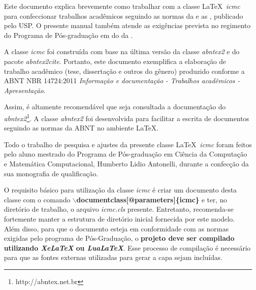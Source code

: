 \newcommand{\comando}[1]{\textbf{$\backslash$#1}}

Este documento explica brevemente como trabalhar com a classe \LaTeX~\textit{icmc} para confeccionar trabalhos acadêmicos seguindo as normas da  e as , publicado pelo  USP. O presente manual também atende as exigências prevista no regimento do Programa de Pós-graduação em  do  da .


A classe \textit{icmc} foi construída com base na última versão da classe \textit{abntex2} e do pacote \textit{abntex2cite}. Portanto, este documento exemplifica a elaboração de trabalho
acadêmico (tese, dissertação e outros do gênero) produzido conforme a ABNT NBR
14724:2011 \textit{Informação e documentação - Trabalhos acadêmicos - Apresentação}.

Assim, é altamente recomendável que seja consultada a documentação do \textit{abntex2}\footnote{http://abntex.net.br}. A classe \textit{abntex2} foi desenvolvida para facilitar a escrita de documentos seguindo as normas da ABNT no ambiente \LaTeX\;\cite{frasson:2005:classe_abnt}.

Todo o trabalho de pesquisa e ajustes da presente classe \LaTeX~\emph{icmc} foram feitos pelo aluno mestrado do Programa de Pós-graduação em Ciência da Computação e Matemática Computacional, Humberto Lidio Antonelli, durante a confecção da sua monografia de qualificação.

O requisito básico para utilização da classe \textit{icmc} é criar um documento desta classe com o comando
\comando{documentclass[@parameters]\{icmc\}} e ter, no diretório de trabalho, o arquivo \emph{icmc.cls} presente. Entretanto, recomenda-se fortemente manter a estrutura de diretório inicial fornecida por este modelo. Além disso, para que o documento esteja em conformidade com as normas exigidas pelo programa de Pós-Graduação, o \textbf{projeto deve ser compilado utilizando \textit{XeLaTeX} ou \textit{LuaLaTeX}}. Esse processo de compilação é necessário para que as fontes externas utilizadas para gerar a capa sejam incluídas.

